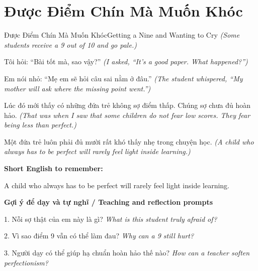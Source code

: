 \section{Được Điểm Chín Mà Muốn Khóc}
\begin{truyen}{Được Điểm Chín Mà Muốn Khóc}{Getting a Nine and Wanting to Cry}
\textit{(Some students receive a 9 out of 10 and go pale.)}

Tôi hỏi: “Bài tốt mà, sao vậy?”
\textit{(I asked, “It’s a good paper. What happened?”)}

Em nói nhỏ: “Mẹ em sẽ hỏi câu sai nằm ở đâu.”
\textit{(The student whispered, “My mother will ask where the missing point went.”)}

Lúc đó mới thấy có những đứa trẻ không sợ điểm thấp. Chúng sợ chưa đủ hoàn hảo.
\textit{(That was when I saw that some children do not fear low scores. They fear being less than perfect.)}

\end{truyen}

\begin{baihoc}
Một đứa trẻ luôn phải đủ mười rất khó thấy nhẹ trong chuyện học.
\textit{(A child who always has to be perfect will rarely feel light inside learning.)}
\end{baihoc}

\begin{ghinhoanh}
\textbf{Short English to remember:}

A child who always has to be perfect will rarely feel light inside learning.

\end{ghinhoanh}

\begin{tuhocnhanh}
\textbf{Gợi ý để dạy và tự nghĩ / Teaching and reflection prompts}

1. Nỗi sợ thật của em này là gì? \textit{What is this student truly afraid of?}

2. Vì sao điểm 9 vẫn có thể làm đau? \textit{Why can a 9 still hurt?}

3. Người dạy có thể giúp hạ chuẩn hoàn hảo thế nào? \textit{How can a teacher soften perfectionism?}
\end{tuhocnhanh}
\ngancach

